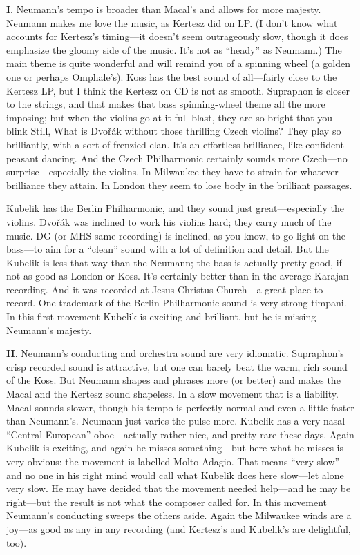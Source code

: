 \documentclass[12pt]{article}%
\begin{document}
{\bf I}. Neumann's tempo is broader than Macal's and allows for more majesty. Neumann makes me love the music, as Kertesz did on LP. (I don't know what accounts for Kertesz's timing---it doesn't seem outrageously slow, though it does emphasize the gloomy side of the music. It's not as ``heady'' as Neumann.) The main theme is quite wonderful and will remind you of a spinning wheel (a golden one or perhaps Omphale's).
Koss has the best sound of all---fairly close to the Kertesz LP, but I think the Kertesz on CD is not as smooth.
Supraphon is closer to the strings, and that makes that bass spinning-wheel
theme all the more imposing; but when the violins go at it full blast, they are so bright 
that you blink Still, What is Dvořák without those thrilling Czech violins? 
They play so brilliantly, with a sort of frenzied elan. 
It's an effortless brilliance, like confident peasant dancing.
And the Czech Philharmonic certainly sounds more Czech---no surprise---especially the violins.
In Milwaukee they have to strain for whatever brilliance they attain.
In London they seem to lose body in the brilliant passages.

Kubelik has the Berlin Philharmonic, and they sound just great---especially the violins.
Dvořák was inclined to work his violins hard; they carry much of the music. 
DG (or MHS same recording) is inclined, as you know, to go light on the bass---to aim
for a ``clean'' sound with a lot of definition and detail. 
But the Kubelik is less that way than the Neumann; the bass is actually
pretty good, if not as good as London or Koss. It's certainly better than in
the average Karajan recording. And it was recorded at Jesus-Christus
Church---a great place to record. One trademark of the Berlin Philharmonic
sound is very strong timpani. 
In this first movement Kubelik is exciting and brilliant, but he is missing Neumann's majesty.

{\bf II}. Neumann's conducting and orchestra
sound are very idiomatic. Supraphon's crisp recorded sound is attractive, 
but one can barely beat the warm, rich sound of the Koss. But Neumann shapes and phrases
more (or better) and makes the Macal and the Kertesz sound shapeless.
In a slow movement that is a liability. Macal sounds slower, though his tempo is perfectly
normal and even a little faster than Neumann's. Neumann just varies the pulse more. 
Kubelik has a very nasal ``Central European'' oboe---actually rather nice, and pretty rare these days.
Again Kubelik is exciting, and again he misses something---but here what he misses is very obvious:
the movement is labelled Molto Adagio. That means ``very slow''
and no one in his right mind would call what Kubelik does here slow---let alone very slow.
He may have decided that the movement needed help---and he may be right---but
the result is not what the composer called for. In this movement Neumann's conducting sweeps
the others aside. Again the Milwaukee winds are a joy---as good as any in any recording
(and Kertesz's and Kubelik's are delightful, too).
\end{document}
